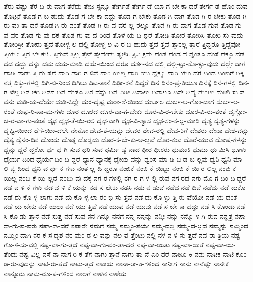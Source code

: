 {ತೆರು-ವಷ್ಟು
ತೆರೆ-ದಿ-ರು-ವಾಗ
ತೆರೆದು
ತೇಜ-ಸ್ಸನ್ನೂ
ತೇರ್ಗಡೆ
ತೇರ್ಗ-ಡೆ-ಯಾ-ಗ-ಬೇ-ಕಾ-ದರೆ
ತೇರ್ಗ-ಡೆ-ಹೊಂ-ದುವ
ತೊಟ್ಟರೆ
ತೊಡ-ಗ-ಬ-ಹುದು
ತೊಡ-ಗ-ಬೇ-ಕಾ-ದದ್ದು
ತೊಡ-ಗ-ಬೇಕು
ತೊಡ-ಗಿ-ದಾಗ
ತೊಡ-ಗಿ-ರ-ಬೇಕು
ತೊಡ-ಗಿ-ರು-ವಂ-ತಾ-ದರೆ
ತೊಡ-ಗಿ-ರು-ವಂತೆ
ತೊಡ-ಗಿ-ರು-ವ-ವರೆ-ಲ್ಲ-ರಲ್ಲೂ
ತೊಡ-ಗಿ-ರು-ವಾಗ
ತೊಡ-ಗುವ
ತೊಡ-ಗು-ವ-ವರ
ತೊಡ-ಗು-ವು-ದಕ್ಕೆ
ತೊಡ-ಗು-ವು-ದ-ರಿಂದ
ತೊಳೆ-ಯ-ದಿ-ದ್ದರೆ
ತೋಡಿ
ತೋರ
ತೋರಿಸಿ
ತೋರಿ-ಸು-ವುದು
ತೋರಿಸ್ರೀ
ತೋರು-ತ್ತದೆ
ತೋಳ್ಬ-ಲ-ದಲ್ಲಿ
ತೋಳ್ಬ-ಲ-ವಿ-ರ-ಬ-ಹುದು
ತ್ತದೆ
ತ್ತವೆ
ತ್ತಾರಲ್ಲ
ತ್ತಾರೆ
ತ್ತಿದ್ದರೂ
ತ್ತಿದ್ದೆವೋ
ತ್ತಿಯೂ
ತ್ತಿರ-ಬೇ-ಕುಓ
ತ್ತಿರುವೆ
ತ್ತಿಲ್ಲ
ತ್ತೇನೆ
ತ್ತೇವೆಂದು
ತ್ಯಜಿಸಿ
ತ್ರಿವಿ-ಕ್ರಮ
ದಂಡ
ದಂಡ-ವ-ನ್ನಂತೂ
ದಂತೆ
ದಕ್ಕೂ
ದಡ-ದಡ
ದದ್ದು
ದನ್ನು
ದಮ
ದಯ-ಮಾಡಿ
ದಯೆ-ಯಿಂದ
ದರೂ
ದರ್ಶ-ನದ
ದಲ್ಲಿ
ದಲ್ಲಿ-ಟ್ಟು-ಕೊ-ಳ್ಳು-ವುದು
ದಲ್ಲೇ
ದಾಗ
ದಾಡಿ
ದಾಡು-ತ್ತಿ-ರು-ತ್ತದೆ
ದಾರಿ
ದಾರಿ-ಗ-ಳಿವೆ
ದಾರಿ-ಯಿಲ್ಲ
ದಾರಿ-ಯು-ದ್ದಕ್ಕೂ
ದಾರಿ-ಯೆಂ-ದರೆ
ದಿಂದ
ದಿಂಬಿಗೆ
ದಿಕ್ಕಿ-ನತ್ತ
ದಿಕ್ಕು-ಗಳಲ್ಲಿ
ದಿಗಿ-ಲಿ-ನಿಂದ
ದಿಗಿಲು
ದಿಟ-ತಾನೆ
ದಿಢೀ-ರನೆ
ದಿದ್ದರೆ
ದಿನ
ದಿನಂ-ಪ್ರ-ತಿಯೂ
ದಿನಕ್ಕೆ
ದಿನ-ಗಳಲ್ಲಿ
ದಿನ-ಗ-ಳೆಲ್ಲ
ದಿನ-ಚರಿ
ದಿನದ
ದಿನ-ವಂತೂ
ದಿನ-ವನ್ನು
ದಿನ-ವಿಡೀ
ದಿನಾಲು
ದಿನಾಲೂ
ದಿನೇ
ದಿವ್ಯ
ದುಂಟು
ದುಃಖಿ-ಸು-ವ-ವನು
ದುಡಿ-ಯ-ದೆಯೇ
ದುಡಿ-ಸಿದ್ದೇ
ದುರ-ದೃಷ್ಟ
ದುರಾ-ಶೆ-ಯಿಂದ
ದುರ್ಬಲ
ದುರ್ಬ-ಲ-ಗೊಂ-ಡಾಗ
ದುರ್ಬ-ಲ-ರಂತೆ
ದುಷ್ಪ-ರಿ-ಣಾ-ಮ-ಗಳು
ದೂರ
ದೂರದ
ದೂರ-ವಾ-ಗ-ಬೇಕು
ದೂರ-ವಿ-ರ-ಬೇಕು
ದೂರ-ವಿ-ರು-ವಂತೆ
ದೃಗ್ಗೋ-ಚ-ರ-ವಾ-ಗು-ವಂತೆ
ದೃಢ
ದೃಢ-ತೆ-ಯಿ-ರಲಿ
ದೃಢ-ವಾಗಿ
ದೃಢ-ವಿ-ಶ್ವಾಸ
ದೃಢ-ಸಂ-ಕ-ಲ್ಪ-ಮಾಡಿ
ದೃಶ್ಯ
ದೃಶ್ಯ-ಗಳನ್ನು
ದೃಷ್ಟಿ-ಯಿಂದ
ದೆಸೆ-ಯಿಂ-ದಲೇ
ದೇನೋ
ದೇವ-ತೆ-ಯನ್ನು
ದೇವರ
ದೇವ-ರಲ್ಲಿ
ದೇವ-ರಿಗೆ
ದೇವರು
ದೇವಾ
ದೇಶ-ವನ್ನು
ದೈತ್ಯ
ದೈನಂ-ದಿನ
ದೊಂದು
ದೊಡ್ಡ
ದೊಡ್ಡದು
ದೊರ-ಕ-ಬೇ-ಕು-ಅ-ಲ್ಲವೆ
ದೊರ-ಕುವ
ದೊರೆ-ಯುವ
ದೋಷ-ಗಳನ್ನು
ದ್ದನ್ನು
ದ್ದರೆ
ದ್ದರೋ
ಧಗ-ಧ-ಗಿ-ಸುವ
ಧರಿ-ಸುವ
ಧರ್ಮಿ-ಷ್ಟ-ನಾದ
ಧೀರ
ಧೀರರು
ಧುಮುಕಿ
ಧುಮು-ಧು-ಮಿಸಿ
ಧೂಳು
ಧೈರ್ಯ-ದಿಂದ
ಧೈರ್ಯ-ದಿಂ-ದಿ-ದ್ದರೆ
ಧ್ಯಾನ
ಧ್ಯಾನಕ್ಕೆ
ಧ್ಯೇಯ-ವನ್ನು
ಧ್ವಂಸ-ಮಾ-ಡಿ-ಬಿ-ಡ-ಬ-ಲ್ಲವು
ಧ್ವನಿ
ಧ್ವನಿ-ಮಾ-ಲಿ-ನ್ಯ-ದಿಂದ
ಧ್ವನಿ-ವ-ರ್ಧ-ಕ-ಗಳು
ನಂತ-ಲ್ಲ-ದಿ-ದ್ದರೂ
ನಂಬಿಕೆ
ನಂಬಿ-ಕೆ-ಯಿಟ್ಟು
ನಂಬಿ-ಕೆ-ಯಿ-ರ-ಲಿಲ್ಲ
ನಂಬಿ-ಕೆ-ಯಿಲ್ಲ
ನಂಬಿ-ಕೆ-ಯಿ-ಲ್ಲದೆ
ನಂಬು-ವು-ದಕ್ಕೆ
ನಗ-ರ-ಗಳಲ್ಲಿ
ನಗ-ರ-ಗ-ಳ-ಲ್ಲಿ-ರುವ
ನಗ-ರದ
ನಗು-ಮೊ-ಗ-ದಿಂ-ದಿ-ದ್ದರೆ
ನಡ-ವ-ಳಿ-ಕೆ-ಗಳು
ನಡ-ವ-ಳಿ-ಕೆ-ಯನ್ನು
ನಡ-ಸ-ಬೇಕು
ನಡಸಿ
ನಡು-ನ-ಡುವೆ
ನಡೆದ
ನಡೆ-ದಿವೆ
ನಡೆದು
ನಡೆ-ದುಕೊ
ನಡೆ-ದು-ಕೊ-ಳ್ಳ-ಲಾಗು
ನಡೆ-ದು-ಕೊ-ಳ್ಳ-ಲಾ-ರಂ-ಭಿ-ಸು-ತ್ತವೆ
ನಡೆ-ದು-ಕೊ-ಳ್ಳು-ತ್ತಿ-ರು-ವೆಯೋ
ನಡೆ-ಯ-ದಂತೆ
ನಡೆ-ಯ-ಬೇಕು
ನಡೆ-ಯಲು
ನಡೆ-ಯು-ತ್ತಿವೆ
ನಡೆ-ಯುವ
ನಡೆ-ಯುವು
ನಡೆ-ಸ-ಬೇ-ಕಾ-ದದ್ದು
ನಡೆ-ಸಿ-ಕೊಂಡು
ನಡೆ-ಸಿ-ಕೊ-ಡು-ತ್ತಾನೆ
ನಡೆ-ಸುತ್ತ
ನಡೆ-ಸುವ
ನನ-ಗಿನ್ನೂ
ನನಗೆ
ನನ್ನ
ನನ್ನನ್ನು
ನನ್ನೀ
ನನ್ನು
ನನ್ನೊ-ಳ-ಗಿ-ರುವ
ನನ್ಹತ್ರ
ನಪಾ-ಸಾ-ಗು-ವ-ವರು
ನಪಾ-ಸಾ-ದರೆ
ನಪಾಸೇ
ನಮಗೆ
ನಮ್ಮ
ನಮ್ಮಂ-ತೆಯೇ
ನಮ್ಮ-ದಲ್ಲ
ನಮ್ಮ-ದ-ಲ್ಲದ
ನಮ್ಮನ್ನು
ನಮ್ಮಿಂದ
ನಮ್ಮಿಂ-ದಾಗಿ
ನರ-ಕ-ಸ-ದೃಶ
ನರ-ಮಂ-ಡ-ಲ-ವನ್ನು
ನಲ-ವ-ತ್ತೆಂಟು
ನಲ್ಲಿ
ನಳ-ನ-ಳಿ-ಸು-ತ್ತದೆ
ನವ-ರಾ-ತ್ರಿಯ
ನಷ್ಟ-ಗೊ-ಳಿ-ಸು-ವಲ್ಲಿ
ನಷ್ಟ-ವಾ-ಗು-ತ್ತದೆ
ನಷ್ಟ-ವಾ-ಗು-ವಂ-ತಾ-ದರೆ
ನಷ್ಟ-ವಾ-ಯಿತು
ನಷ್ಟ-ವಾ-ಯಿತೆ
ನಷ್ಟ-ವಾ-ಯಿ-ತೆಂದು
ನಷ್ಟ-ವಿಲ್ಲ
ನಸೆ
ನಾ
ನಾಗ-ರಿ-ಕ-ತೆಗೆ
ನಾಗು-ತ್ತಾನೆ
ನಾಗು-ತ್ತಾ-ನೆ-ಎಂ-ದರೆ
ನಾಜೂ-ಕಿ-ನದು
ನಾಟಕ
ನಾಟಿ-ಕೊಂ-ಡಿ-ರು-ವುದನ್ನು
ನಾಟಿ-ರು-ತ್ತದೆ
ನಾಟು-ತ್ತದೆ
ನಾಡಿಯ
ನಾನಾ-ರೀ-ತಿ-ಗಳಿಂದ
ನಾನೀಗ
ನಾನು
ನಾನೆಷ್ಟೇ
ನಾನೇಕೆ
ನಾನ್ನೂರು
ನಾಮ-ರೂ-ಪ-ಗಳಿಂದ
ನಾಲಗೆ
ನಾಳಿನ
ನಾಳೆಯ
}
